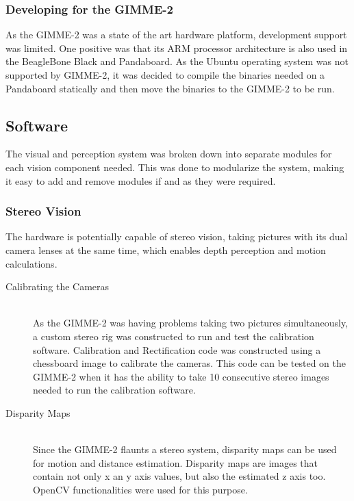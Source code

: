 \subsubsection{Developing for the GIMME-2}
As the GIMME-2 was a state of the art hardware platform, development support was limited. One positive was that its ARM processor architecture is also used in the BeagleBone Black and Pandaboard. As the Ubuntu operating system was not supported by GIMME-2, it was decided to compile the binaries needed on a Pandaboard statically and then move the binaries to the GIMME-2 to be run.

\subsection{Software}
The visual and perception system was broken down into separate modules for each vision component needed. This was done to modularize the system, making it easy to add and remove modules if and as they were required.  
\subsubsection{Stereo Vision}
The hardware is potentially capable of stereo vision, taking pictures with its dual camera lenses at the same time, which enables depth perception and motion calculations.

\begin{description}
  \item [Calibrating the Cameras] \hfill \\As the GIMME-2 was having problems taking two pictures simultaneously, a custom stereo rig was constructed to run and test the calibration software. Calibration and Rectification code was constructed using a chessboard image to calibrate the cameras. This code can be tested on the GIMME-2 when it has the ability to take 10 consecutive stereo images needed to run the calibration software.
  \item [Disparity Maps] \hfill \\Since the GIMME-2 flaunts a stereo system, disparity maps can be used for motion and distance estimation. Disparity maps are images that contain not only x an y axis values, but also the estimated z axis too. OpenCV functionalities were used for this purpose.

\end{description}

